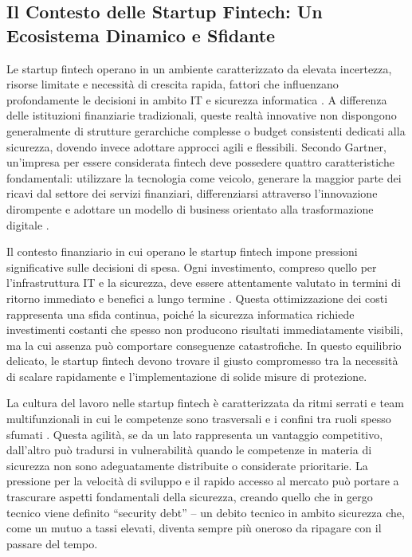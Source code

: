 \documentclass[a4paper,12pt]{report}
\begin{document}
\subsection*{Il Contesto delle Startup Fintech: Un Ecosistema Dinamico e Sfidante}

Le startup fintech operano in un ambiente caratterizzato da elevata incertezza, risorse limitate e necessità di crescita rapida, fattori che influenzano profondamente le decisioni in ambito IT e sicurezza informatica \cite{fintechChallenges}. A differenza delle istituzioni finanziarie tradizionali, queste realtà innovative non dispongono generalmente di strutture gerarchiche complesse o budget consistenti dedicati alla sicurezza, dovendo invece adottare approcci agili e flessibili. Secondo Gartner, un’impresa per essere considerata fintech deve possedere quattro caratteristiche fondamentali: utilizzare la tecnologia come veicolo, generare la maggior parte dei ricavi dal settore dei servizi finanziari, differenziarsi attraverso l’innovazione dirompente e adottare un modello di business orientato alla trasformazione digitale \cite{gartnerFintech}.

Il contesto finanziario in cui operano le startup fintech impone pressioni significative sulle decisioni di spesa. Ogni investimento, compreso quello per l’infrastruttura IT e la sicurezza, deve essere attentamente valutato in termini di ritorno immediato e benefici a lungo termine \cite{fintechChallenges}. Questa ottimizzazione dei costi rappresenta una sfida continua, poiché la sicurezza informatica richiede investimenti costanti che spesso non producono risultati immediatamente visibili, ma la cui assenza può comportare conseguenze catastrofiche. In questo equilibrio delicato, le startup fintech devono trovare il giusto compromesso tra la necessità di scalare rapidamente e l’implementazione di solide misure di protezione.

La cultura del lavoro nelle startup fintech è caratterizzata da ritmi serrati e team multifunzionali in cui le competenze sono trasversali e i confini tra ruoli spesso sfumati \cite{fintechChallenges}. Questa agilità, se da un lato rappresenta un vantaggio competitivo, dall’altro può tradursi in vulnerabilità quando le competenze in materia di sicurezza non sono adeguatamente distribuite o considerate prioritarie. La pressione per la velocità di sviluppo e il rapido accesso al mercato può portare a trascurare aspetti fondamentali della sicurezza, creando quello che in gergo tecnico viene definito “security debt” – un debito tecnico in ambito sicurezza che, come un mutuo a tassi elevati, diventa sempre più oneroso da ripagare con il passare del tempo.
\end{document}
